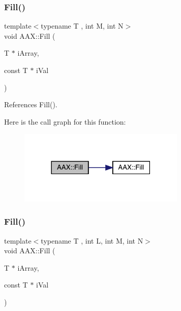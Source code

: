 \subsubsection{\texorpdfstring{Fill()}{Fill()}\hspace{0.1cm}{\footnotesize\ttfamily [2/3]}}
{\footnotesize\ttfamily template$<$typename T , int M, int N$>$ \\
void A\+A\+X\+::\+Fill (\begin{DoxyParamCaption}\item[{T $\ast$}]{i\+Array,  }\item[{const T $\ast$}]{i\+Val }\end{DoxyParamCaption})\hspace{0.3cm}{\ttfamily [inline]}}



References Fill().

Here is the call graph for this function\+:
\nopagebreak
\begin{figure}[H]
\begin{center}
\leavevmode
\includegraphics[width=225pt]{a00852_a480beff32ac0847c665f735fd8f78c0a_cgraph}
\end{center}
\end{figure}
\mbox{\label{a00852_a114e6f06cf5789da4aad7ae0d786876e}} 
\subsubsection{\texorpdfstring{Fill()}{Fill()}\hspace{0.1cm}{\footnotesize\ttfamily [3/3]}}
{\footnotesize\ttfamily template$<$typename T , int L, int M, int N$>$ \\
void A\+A\+X\+::\+Fill (\begin{DoxyParamCaption}\item[{T $\ast$}]{i\+Array,  }\item[{const T $\ast$}]{i\+Val }\end{DoxyParamCaption})\hspace{0.3cm}{\ttfamily [inline]}}



